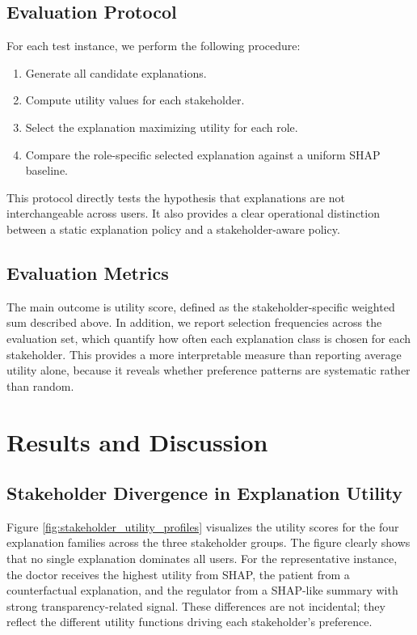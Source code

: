 \documentclass{article}
\begin{document}
\subsection{Evaluation Protocol}

For each test instance, we perform the following procedure:

\begin{enumerate}[leftmargin=1.8em]
    \item Generate all candidate explanations.
    \item Compute utility values for each stakeholder.
    \item Select the explanation maximizing utility for each role.
    \item Compare the role-specific selected explanation against a uniform SHAP baseline.
\end{enumerate}

This protocol directly tests the hypothesis that explanations are not interchangeable across users. It also provides a clear operational distinction between a static explanation policy and a stakeholder-aware policy.

\subsection{Evaluation Metrics}

The main outcome is utility score, defined as the stakeholder-specific weighted sum described above. In addition, we report selection frequencies across the evaluation set, which quantify how often each explanation class is chosen for each stakeholder. This provides a more interpretable measure than reporting average utility alone, because it reveals whether preference patterns are systematic rather than random.

\section{Results and Discussion}

\subsection{Stakeholder Divergence in Explanation Utility}

Figure \ref{fig:stakeholder_utility_profiles} visualizes the utility scores for the four explanation families across the three stakeholder groups. The figure clearly shows that no single explanation dominates all users. For the representative instance, the doctor receives the highest utility from SHAP, the patient from a counterfactual explanation, and the regulator from a SHAP-like summary with strong transparency-related signal. These differences are not incidental; they reflect the different utility functions driving each stakeholder's preference.
\end{document}
